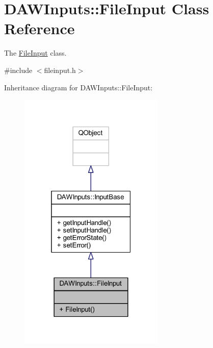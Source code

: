 \hypertarget{class_d_a_w_inputs_1_1_file_input}{\section{D\-A\-W\-Inputs\-:\-:File\-Input Class Reference}
\label{class_d_a_w_inputs_1_1_file_input}
}


The \hyperlink{class_d_a_w_inputs_1_1_file_input}{File\-Input} class.  




{\ttfamily \#include $<$fileinput.\-h$>$}



Inheritance diagram for D\-A\-W\-Inputs\-:\-:File\-Input\-:
\nopagebreak
\begin{figure}[H]
\begin{center}
\leavevmode
\includegraphics[width=196pt]{class_d_a_w_inputs_1_1_file_input__inherit__graph}
\end{center}
\end{figure}



